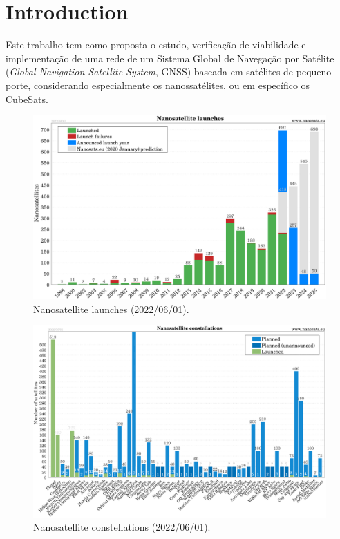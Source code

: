 %
%
%
%
%

%
%
%
%
%

\section{Introduction} \label{sec:introduction}

Este trabalho tem como proposta o estudo, verificação de viabilidade e implementação de uma rede de um Sistema Global de Navegação por Satélite (\textit{Global Navigation Satellite System}, GNSS) baseada em satélites de pequeno porte, considerando especialmente os nanossatélites, ou em específico os CubeSats.

\cite{nanosatseu}

\begin{figure}[!ht]
    \begin{center}
        \includegraphics[width=\columnwidth]{figures/Nanosats_years_2022-06-01}
        \caption{Nanosatellite launches (2022/06/01).}
        \label{fig:cubesat-launches}
    \end{center}
\end{figure}

\begin{figure}[!ht]
    \begin{center}
        \includegraphics[width=\columnwidth]{figures/Nanosats_constellations_2022-06-01}
        \caption{Nanosatellite constellations (2022/06/01).}
        \label{fig:constellations}
    \end{center}
\end{figure}
